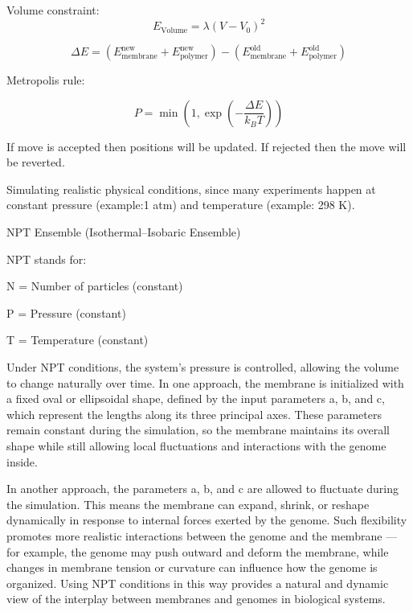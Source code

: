 \documentclass[12pt]{article}
\begin{document}
\begin{flushleft}
Volume constraint:
\begin{equation}
E_{\text{Volume}} = \lambda(V - V_0)^2
\end{equation}



\begin{equation}
\Delta E = (E_{\text{membrane}}^{\text{new}} + E_{\text{polymer}}^{\text{new}}) - (E_{\text{membrane}}^{\text{old}} + E_{\text{polymer}}^{\text{old}})
\end{equation}


Metropolis rule:

\begin{equation}
P = \min\left(1, \exp\left(-\frac{\Delta E}{k_B T}\right)\right)
\end{equation}

If move is accepted then positions will be updated. If rejected then the move will be reverted.

Simulating realistic physical conditions, since many experiments happen at constant pressure (example:1 atm) and temperature  (example: 298 K).

\noindent NPT Ensemble (Isothermal–Isobaric Ensemble)

NPT stands for:

    N = Number of particles (constant)

    P = Pressure (constant)

    T = Temperature (constant)
    
    Under NPT conditions, the system’s pressure is controlled, allowing the volume to change naturally over time. In one approach, the membrane is initialized with a fixed oval or ellipsoidal shape, defined by the input parameters a, b, and c, which represent the lengths along its three principal axes. These parameters remain constant during the simulation, so the membrane maintains its overall shape while still allowing local fluctuations and interactions with the genome inside.

In another approach, the parameters a, b, and c are allowed to fluctuate during the simulation. This means the membrane can expand, shrink, or reshape dynamically in response to internal forces exerted by the genome. Such flexibility promotes more realistic interactions between the genome and the membrane — for example, the genome may push outward and deform the membrane, while changes in membrane tension or curvature can influence how the genome is organized. Using NPT conditions in this way provides a natural and dynamic view of the interplay between membranes and genomes in biological systems.


\end{flushleft}
\end{document}
